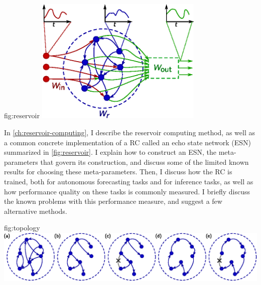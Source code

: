 \begin{reusefigure}{fig:reservoir}
  \includegraphics[width=0.6\textwidth]{figures/reservoir}
  \caption{High-level view of an echo state network RC. Each node may
    have two kinds of input connections: connections to other nodes in
    the network ($W_r$, blue), connections to the overall input
    ($W_\text{in}$, red). Each node may also have output connections
    to the overall output ($W_\text{out}$, green). Note that the
    internal connections may contain cycles.  When the RC is used to
    perform forecasting, the output on the right side is connected to
    the input on the left side, allowing the RC to run autonomously
    with no external input.}%
\end{reusefigure}

In \cref{ch:reservoir-computing}, I describe the reservoir computing
method, as well as a common concrete implementation of a RC called an
echo state network (ESN) summarized in \cref{fig:reservoir}. I explain how to construct an ESN, the
meta-parameters that govern its construction, and discuss some of the
limited known results for choosing these meta-parameters. Then, I
discuss how the RC is trained, both for autonomous forecasting tasks
and for inference tasks, as well as how performance quality on these
tasks is commonly measured. I briefly discuss the known problems with
this performance measure, and suggest a few alternative methods.

\begin{reusefigure}{fig:topology}
  \includegraphics[width=\textwidth]{figures/topology}
  \caption{The five reservoir structures tested. Only internal
    reservoir connections are pictured. Connections to the reservoir
    computer input, or to the output layer are not shown. (a) A
    general, fixed in-degree network, here pictured with $N=7$ and
    $k=2$. (b) A $k=1$ network with a single connected component. (c)
    A $k=1$ network with the single cycle cut at an arbitrary
    point. (d) A \emph{simple cycle reservoir}. (e) A \emph{delay line
      reservoir}.}%
\end{reusefigure}


